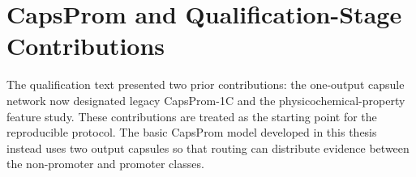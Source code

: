 \section{CapsProm and Qualification-Stage Contributions}\label{sec:rw-capsprom}

The qualification text presented two prior contributions: the one-output
capsule network now designated legacy CapsProm-1C and the
physicochemical-property feature study. These contributions are treated as the
starting point for the reproducible protocol. The basic CapsProm model developed
in this thesis instead uses two output capsules so that routing can distribute
evidence between the non-promoter and promoter classes.
